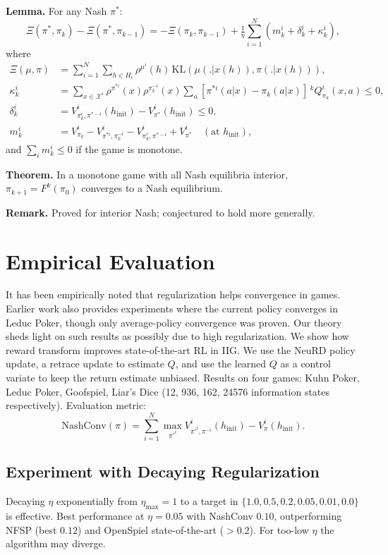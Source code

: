 \textbf{Lemma.} For any Nash $\pi^*$:
$$\Xi(\pi^*, \pi_k) - \Xi(\pi^*, \pi_{k-1}) = -\Xi(\pi_k, \pi_{k-1}) + \tfrac{1}{\eta}\sum_{i=1}^N (m_k^i + \delta_k^i + \kappa_k^i),$$
where
\begin{align*}
\Xi(\mu,\pi) &= \sum_{i=1}^N \sum_{h \in H_i} \rho^{\mu^i}(h)\, \textrm{KL}(\mu(.|x(h)), \pi(.|x(h))),\\
\kappa^i_k &= \sum_{x \in \mathcal{X}^i}\rho^{\pi^{*i}}(x)\rho^{\pi_k^{-i}}(x)\sum_a\left[\pi^{*i}(a|x)-\pi_k(a|x)\right]\,{}^k\!Q^i_{\pi_k}(x,a) \leq 0,\\
\delta^i_k &= V^i_{\pi^i_k, \pi^{*-i}}(h_{\textrm{init}}) - V^i_{\pi^*}(h_{\textrm{init}}) \leq 0,\\
m^i_k &= V^i_{\pi_k} - V^i_{\pi^{*i}, \pi^{-i}_k} - V^i_{\pi^i_k, \pi^{*-i}} + V^i_{\pi^*}\quad(\text{at } h_{\textrm{init}}),
\end{align*}
and $\sum_i m^i_k \leq 0$ if the game is monotone.

\textbf{Theorem.} In a monotone game with all Nash equilibria interior, $\pi_{k+1}=F^k(\pi_0)$ converges to a Nash equilibrium.

\textbf{Remark.} Proved for interior Nash; conjectured to hold more generally.

\section{Empirical Evaluation}
It has been empirically noted that regularization helps convergence in games. Earlier work also provides experiments where the current policy converges in Leduc Poker, though only average-policy convergence was proven. Our theory sheds light on such results as possibly due to high regularization. We show how reward transform improves state-of-the-art RL in IIG. We use the NeuRD policy update, a retrace update to estimate $Q$, and use the learned $Q$ as a control variate to keep the return estimate unbiased. Results on four games: Kuhn Poker, Leduc Poker, Goofspiel, Liar's Dice (12, 936, 162, 24576 information states respectively). Evaluation metric:
$$\mathrm{NashConv}(\pi) = \sum_{i=1}^N \max_{\pi'^i}V^i_{\pi'^i,\pi^{-i}}(h_{\textrm{init}}) - V^i_{\pi}(h_{\textrm{init}}).$$

\subsection{Experiment with Decaying Regularization}
Decaying $\eta$ exponentially from $\eta_{\max}=1$ to a target in $\{1.0, 0.5, 0.2, 0.05, 0.01, 0.0\}$ is effective. Best performance at $\eta=0.05$ with NashConv $0.10$, outperforming NFSP (best $0.12$) and OpenSpiel state-of-the-art ($>0.2$). For too-low $\eta$ the algorithm may diverge.

